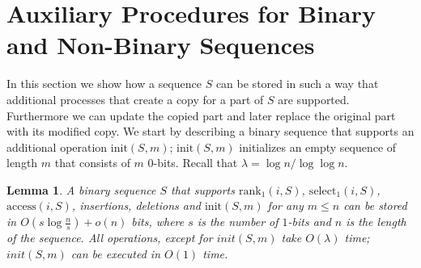 \documentclass[11pt]{article}\usepackage{fullpage}
\def\idrm#1{\ensuremath{\mathrm{#1}}}
\newtheorem{lemma}{Lemma}
\newcommand{\ra}{\idrm{rank}}
\newcommand{\sel}{\idrm{select}}
\newcommand{\acc}{\idrm{access}}
\newcommand{\init}{\idrm{init}}
\begin{document}
\section{Auxiliary Procedures for Binary and Non-Binary Sequences}
\label{sec:seqaddition}
In this section we show how a sequence $S$ can be stored  in such a way that additional processes that create a copy for a part 
of $S$ are supported. Furthermore we can update the copied part and later replace the original part with its modified copy. 
We start by describing a binary sequence that supports an additional operation $\init(S,m)$; $\init(S,m)$ initializes an empty sequence of length $m$ that consists of $m$ $0$-bits.  Recall that $\lambda=\log n/\log\log n$.
\begin{lemma}
\label{lemma:ints}
  A binary sequence $S$ that supports $\ra_1(i,S)$, $\sel_1(i,S)$, $\acc(i,S)$, insertions, deletions and $\init(S,m)$ for any $m\le n$  can be stored in $O(s\log\frac{n}{s})+o(n)$ bits, where $s$ is the number of $1$-bits and $n$ is the length of the sequence. All operations, except for $init(S,m)$ take $O(\lambda)$ time; $init(S,m)$ can be executed in $O(1)$ time.
\end{lemma}
\end{document}
